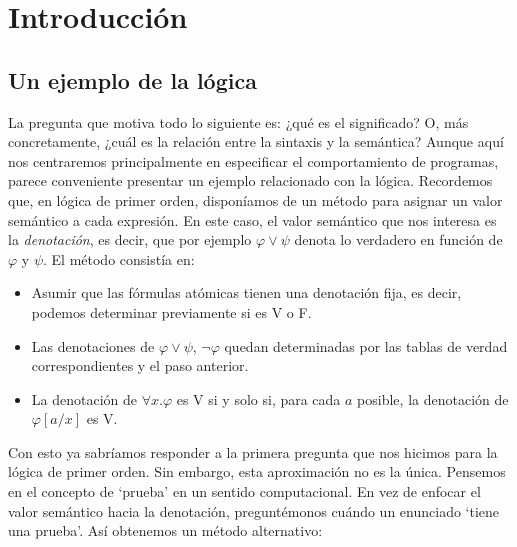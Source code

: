 \cleardoublepage
\chapter{Introducción}
						
\section{Un ejemplo de la lógica}
La pregunta que motiva todo lo siguiente es: ¿qué es el significado? O, más concretamente, ¿cuál es la relación entre la sintaxis y la semántica? Aunque aquí nos centraremos principalmente en especificar el comportamiento de programas, parece conveniente presentar un ejemplo relacionado con la lógica. Recordemos que, en lógica de primer orden, disponíamos de un método para asignar un valor semántico a cada expresión. En este caso, el valor semántico que nos interesa es la \textit{denotación}, es decir, que por ejemplo $\varphi \lor \psi$ denota lo verdadero en función de $\varphi$ y $\psi$. El método consistía en:
\begin{itemize}
    \item Asumir que las fórmulas atómicas tienen una denotación fija, es decir, podemos determinar previamente si es V o F.
    \item Las denotaciones de $\varphi \lor \psi$, $\neg \varphi$ quedan determinadas por las tablas de verdad correspondientes y el paso anterior.
    \item La denotación de $\forall x. \varphi$ es V si y solo si, para cada $a$ posible, la denotación de $\varphi[a/x]$ es V.
\end{itemize}
Con esto ya sabríamos responder a la primera pregunta que nos hicimos para la lógica de primer orden. Sin embargo, esta aproximación no es la única. Pensemos en el concepto de `prueba' en un sentido computacional. En vez de enfocar el valor semántico hacia la denotación, preguntémonos cuándo un enunciado `tiene una prueba'. Así obtenemos un método alternativo:
